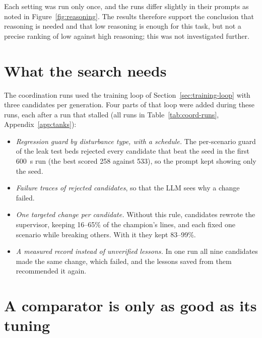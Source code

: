 Each setting was run only once, and the runs differ slightly in their
prompts as noted in Figure~\ref{fig:reasoning}. The results therefore support
the conclusion that reasoning is needed and that low reasoning is enough for
this task, but not a precise ranking of low against high reasoning; this was
not investigated further.

\section{What the search needs}
\label{sec:tank-search}
The coordination runs used the training loop of
Section~\ref{sec:training-loop} with three candidates per generation. Four
parts of that loop were added during these runs, each after a run that
stalled (all runs in Table~\ref{tab:coord-runs}, Appendix~\ref{app:tanks}):
\begin{itemize}
\item \emph{Regression guard by disturbance type, with a schedule.} The
  per-scenario guard of the leak test beds rejected every candidate that beat
  the seed in the first 600~s run (the best scored 258 against 533), so the
  prompt kept showing only the seed.
\item \emph{Failure traces of rejected candidates}, so that the LLM sees why a
  change failed.
\item \emph{One targeted change per candidate.} Without this rule,
  candidates rewrote the supervisor, keeping 16--65\% of the champion's lines,
  and each fixed one scenario while breaking others. With it they kept
  83--99\%.
\item \emph{A measured record instead of unverified lessons.} In one run all
  nine candidates made the same change, which failed, and the lessons saved
  from them recommended it again.
\end{itemize}

\section{A comparator is only as good as its tuning}
\label{sec:tank-comparator}


